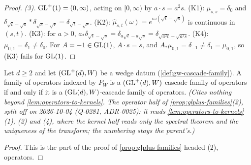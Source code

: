 \begin{proof}
\emph{(3).} $\mathrm{GL}^+(1) = (0,\infty)$, acting on $[0,\infty)$ by $a \cdot s = a^2s$. (K1):
$\mu_{s,s} = \delta_0$ and $\delta_{\sqrt t - \sqrt s} * \delta_{\sqrt s - \sqrt r} = \delta_{\sqrt t - \sqrt r}$.
(K2): $\widehat\mu_{s,t}(\omega) = e^{i\omega(\sqrt t - \sqrt s)}$ is continuous in $(s,t)$. (K3): for
$a > 0$, $a_*\delta_{\sqrt t - \sqrt s} = \delta_{a\sqrt t - a\sqrt s} = \delta_{\sqrt{a^2t} - \sqrt{a^2s}}$.
(K4): $\mu_{0,1} = \delta_1 \ne \delta_0$. For $A = -1 \in \mathrm{GL}(1)$, $A \cdot s = s$, and
$A_*\mu_{0,1} = \delta_{-1} \ne \delta_1 = \mu_{0,1}$, so (K3) fails for $\mathrm{GL}(1)$.
\end{proof}

\begin{lemma}
\label{lem:glplus-operator-families}
\leanok
Let $d \ge 2$ and let $(\mathrm{GL}^+(d), W)$ be a wedge datum (\ref{def:gw-cascade-family}). A family of
operators indexed by $P_W$ is a $(\mathrm{GL}^+(d), W)$-cascade family of operators if and only if it is a
$(\mathrm{GL}(d), W)$-cascade family of operators.
\statusT\quad\emph{(Cites nothing beyond \ref{lem:operators-to-kernels}. The operator half of
\ref{prop:glplus-families}(2), split off on 2026-10-04 (Q-0281, ADR-0025): it reads
\ref{lem:operators-to-kernels}(1), (2) and (4), where the kernel half reads only the spectral theorem
and the uniqueness of the transform; the numbering stays the parent's.)}
\end{lemma}

\begin{proof}
\leanok
This is the part of the proof of \ref{prop:glplus-families} headed (2), operators.
\end{proof}

